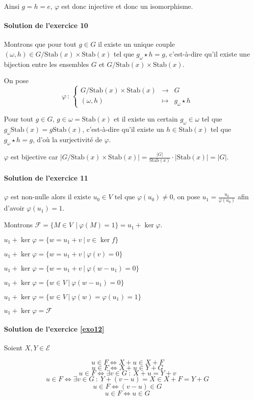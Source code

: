 \documentclass[]{article}
\theoremstyle{remark}
\theoremstyle{definition}
\newcommand{\func}[5]{
#1 \, : \, \left\{ \begin{array}{lcl}
	#2 & \longrightarrow & #3 \\
	#4 & \longmapsto & #5
\end{array}
\right.
}
\begin{document}
Ainsi $g = h = e$, $\varphi$ est donc injective et donc un isomorphisme.

\paragraph{Solution de l'exercice 10}

Montrons que pour tout $g \in G$ il existe un unique couple $(\omega, h) \in G / \text{Stab}(x) \times \text{Stab}(x)$ tel que $g_\omega \star h = g$, c'est-à-dire qu'il existe une bijection entre les ensembles $G$ et $G/\text{Stab}(x) \times \text{Stab}(x)$.

On pose $$\func{\varphi}{G/\text{Stab}(x) \times \text{Stab}(x)}{G}{(\omega, h)}{g_\omega \star h}$$

Pour tout $g \in G$, $g \in \omega = \text{Stab}(x)$ et il existe un certain $g_\omega \in \omega$ tel que $g_\omega \text{Stab}(x) = g \text{Stab}(x)$, c'est-à-dire qu'il existe un $h \in \text{Stab}(x)$ tel que $g_\omega \star h = g$, d'où la surjectivité de $\varphi$.

$\varphi$ est bijective car $\left|G / \text{Stab}(x) \times \text{Stab}(x)\right| = \frac{|G|}{\text{Stab}(x)} \cdot |\text{Stab}(x)| = |G|$.

\paragraph{Solution de l'exercice 11}

$\varphi$ est non-nulle alors il existe $u_0 \in V$ tel que $\varphi(u_0) \neq 0$, on pose $u_1 = \frac{u_0}{\varphi(u_0)}$ afin d'avoir $\varphi(u_1) = 1$.

Montrons $\mathcal{F} = \{M \in V\ ~ | ~ \varphi(M) = 1\} = u_1 + \ker \varphi$.

$u_1 + \ker \varphi = \{w = u_1 + v ~ | ~ v \in \ker f\}$

$u_1 + \ker \varphi = \{w = u_1 + v ~ | ~  \varphi(v) = 0\}$

$u_1 + \ker \varphi = \{w = u_1 + v ~ | ~ \varphi(w - u_1) = 0\}$

$u_1 + \ker \varphi = \{w \in V ~ | ~ \varphi(w - u_1) = 0\}$

$u_1 + \ker \varphi = \{w \in V ~ | ~ \varphi(w) = \varphi(u_1) = 1\}$

$u_1 + \ker \varphi = \mathcal{F}$

\paragraph{Solution de l'exercice \ref{exo12}}

Soient $X, Y \in \mathcal{E}$

$$u \in F \Longleftrightarrow X + u \in X + F$$
$$u \in F \Longleftrightarrow X + u \in Y + G$$
$$u \in F \Longleftrightarrow \exists v \in G ~ : ~ X + u = Y + v$$
$$u \in F \Longleftrightarrow \exists v \in G ~ : ~ Y + (v - u) = X \in X + F = Y + G$$
$$u \in F \Longleftrightarrow (v - u) \in G$$
$$u\in F \Longleftrightarrow u \in G$$
\end{document}

